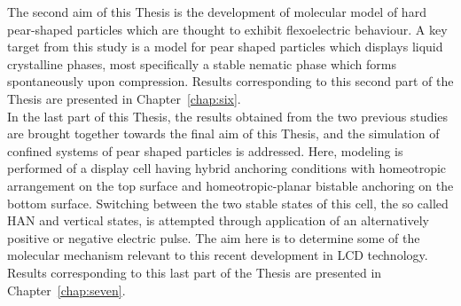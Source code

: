 The second aim of this Thesis is the development of molecular
model of hard pear-shaped particles which are thought to exhibit flexoelectric
behaviour. 
A key target from this study is a model for pear shaped particles which displays liquid 
crystalline phases,
most specifically a stable nematic phase which forms spontaneously upon compression.
Results corresponding to this second part of the Thesis are presented in Chapter~\ref{chap:six}.\\

In the last part of this Thesis, the results obtained from the two previous studies are brought
together towards the final aim of this Thesis, and the simulation of confined systems of pear
shaped particles is addressed. Here, modeling is performed of a display cell having hybrid 
anchoring conditions with homeotropic
arrangement on the top surface and homeotropic-planar bistable
anchoring on the bottom surface. Switching between the two stable states of this cell, the so
called HAN and vertical states, is
attempted through application of an alternatively positive or
negative electric pulse. The aim here is to determine some of the molecular mechanism relevant to
this recent development in LCD technology. Results corresponding to this last part of the Thesis
are presented in Chapter~\ref{chap:seven}.

